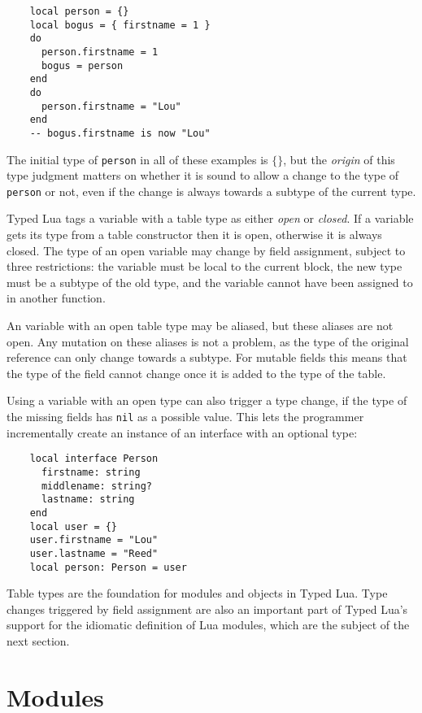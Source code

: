 \documentclass{sig-alternate}
\begin{document}
\begin{verbatim}
    local person = {}
    local bogus = { firstname = 1 }
    do
      person.firstname = 1
      bogus = person
    end
    do
      person.firstname = "Lou"
    end
    -- bogus.firstname is now "Lou"
\end{verbatim}

The initial type of {\tt person} in all of these examples is
$\{\}$, but the {\em origin} of this type judgment matters
on whether it is sound to allow a change to the type of
{\tt person} or not, even if the change is always towards
a subtype of the current type.

Typed Lua tags a variable with a table type as either
{\em open} or {\em closed}. If a variable gets its type
from a table constructor then it is open, otherwise it is
always closed. The type of an open variable may change
by field assignment, subject to three restrictions: the
variable must be local to the current block, the new type
must be a subtype of the old type, and the variable
cannot have been assigned to in another function.

An variable with an open table type may be aliased, but
these aliases are not open. Any mutation on these aliases
is not a problem, as the type of the original reference
can only change towards a subtype. For mutable fields
this means that the type of the field cannot change
once it is added to the type of the table.

Using a variable with an open type can also trigger a
type change, if the type of the missing fields has
{\tt nil} as a possible value. This lets the programmer
incrementally create an instance of an interface with
an optional type:

\begin{verbatim}
    local interface Person
      firstname: string
      middlename: string?
      lastname: string
    end
    local user = {}
    user.firstname = "Lou"
    user.lastname = "Reed"
    local person: Person = user
\end{verbatim}

Table types are the foundation for modules and objects in
Typed Lua. Type changes triggered by field assignment are
also an important part of Typed Lua's support for the
idiomatic definition of Lua modules, which are the
subject of the next section.

\section{Modules}
\label{sec:modules}
\end{document}
